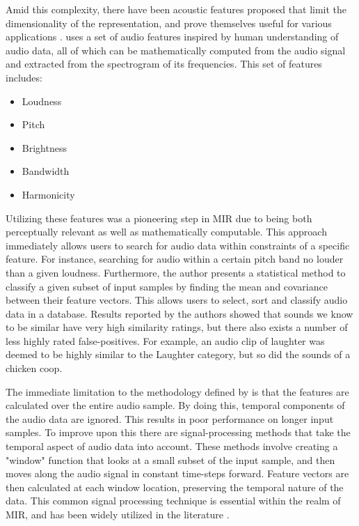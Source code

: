 \documentclass[twoside]{article}
\begin{document}
\begin{multicols}{2}
Amid this complexity, there have been acoustic features proposed that limit the dimensionality of the representation, and prove themselves useful for various applications \citep{Wold96,Typke04,Prechelt01}. \cite{Wold96} uses a set of audio features inspired by human understanding of audio data, all of which can be mathematically computed from the audio signal and extracted from the spectrogram of its frequencies. This set of features includes: 
\begin{itemize}
\item Loudness
\item Pitch
\item Brightness
\item Bandwidth
\item Harmonicity
\end{itemize}
Utilizing these features was a pioneering step in MIR due to being both perceptually relevant as well as mathematically computable. This approach immediately allows users to search for audio data within constraints of a specific feature. For instance, searching for audio within a certain pitch band no louder than a given loudness. Furthermore, the author presents a statistical method to classify a given subset of input samples by finding the mean and covariance between their feature vectors. This allows users to select, sort and classify audio data in a database. Results reported by the authors showed that sounds we know to be similar have very high similarity ratings, but there also exists a number of less highly rated false-positives. For example, an audio clip of laughter was deemed to be highly similar to the Laughter category, but so did the sounds of a chicken coop.

The immediate limitation to the methodology defined by \citet{Wold96} is that the features are calculated over the entire audio sample. By doing this, temporal components of the audio data are ignored. This results in poor performance on longer input samples. To improve upon this there are signal-processing methods that take the temporal aspect of audio data into account. These methods involve creating a "window" function that looks at a small subset of the input sample, and then moves along the audio signal in constant time-steps forward. Feature vectors are then calculated at each window location, preserving the temporal nature of the data. This common signal processing technique is essential within the realm of MIR, and has been widely utilized in the literature \citet{Foote1997,Lidy05,Tzanetakis02,Hamel2010LearningFeatures,Mierswa2005AutoFeatureExtr}.


\end{multicols}
\end{document}
